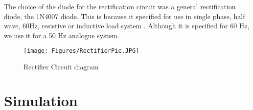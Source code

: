 The choice of the diode for the rectification circuit was a general rectification diode, the 1N4007 diode. This is because it specified for use in single  phase, half wave, 60Hz, resistive or inductive load system \cite{DiodesI:1N4007}. Although it is specified for 60 Hz, we use it for a 50 Hz analogue system.

\begin{figure}[h]
    \centering
    \texttt{[image: Figures/RectifierPic.JPG]}
    \caption{Rectifier Circuit diagram}
    \label{fig:Sim_rect}
\end{figure}






\section{Simulation} \label{sec:simulation_rectifier}

